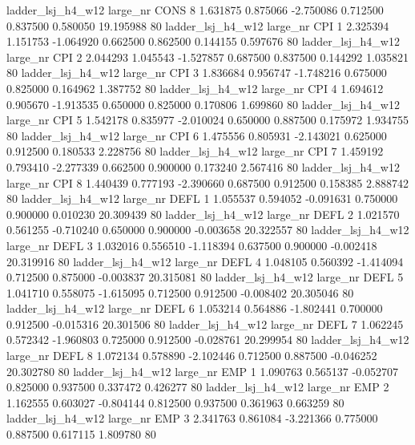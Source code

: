   ladder_lsj_h4_w12   large_nr     CONS                 8  1.631875  0.875066  -2.750086 0.712500 0.837500  0.580050   19.195988 80
  ladder_lsj_h4_w12   large_nr      CPI                 1  2.325394  1.151753  -1.064920 0.662500 0.862500  0.144155    0.597676 80
  ladder_lsj_h4_w12   large_nr      CPI                 2  2.044293  1.045543  -1.527857 0.687500 0.837500  0.144292    1.035821 80
  ladder_lsj_h4_w12   large_nr      CPI                 3  1.836684  0.956747  -1.748216 0.675000 0.825000  0.164962    1.387752 80
  ladder_lsj_h4_w12   large_nr      CPI                 4  1.694612  0.905670  -1.913535 0.650000 0.825000  0.170806    1.699860 80
  ladder_lsj_h4_w12   large_nr      CPI                 5  1.542178  0.835977  -2.010024 0.650000 0.887500  0.175972    1.934755 80
  ladder_lsj_h4_w12   large_nr      CPI                 6  1.475556  0.805931  -2.143021 0.625000 0.912500  0.180533    2.228756 80
  ladder_lsj_h4_w12   large_nr      CPI                 7  1.459192  0.793410  -2.277339 0.662500 0.900000  0.173240    2.567416 80
  ladder_lsj_h4_w12   large_nr      CPI                 8  1.440439  0.777193  -2.390660 0.687500 0.912500  0.158385    2.888742 80
  ladder_lsj_h4_w12   large_nr     DEFL                 1  1.055537  0.594052  -0.091631 0.750000 0.900000  0.010230   20.309439 80
  ladder_lsj_h4_w12   large_nr     DEFL                 2  1.021570  0.561255  -0.710240 0.650000 0.900000 -0.003658   20.322557 80
  ladder_lsj_h4_w12   large_nr     DEFL                 3  1.032016  0.556510  -1.118394 0.637500 0.900000 -0.002418   20.319916 80
  ladder_lsj_h4_w12   large_nr     DEFL                 4  1.048105  0.560392  -1.414094 0.712500 0.875000 -0.003837   20.315081 80
  ladder_lsj_h4_w12   large_nr     DEFL                 5  1.041710  0.558075  -1.615095 0.712500 0.912500 -0.008402   20.305046 80
  ladder_lsj_h4_w12   large_nr     DEFL                 6  1.053214  0.564886  -1.802441 0.700000 0.912500 -0.015316   20.301506 80
  ladder_lsj_h4_w12   large_nr     DEFL                 7  1.062245  0.572342  -1.960803 0.725000 0.912500 -0.028761   20.299954 80
  ladder_lsj_h4_w12   large_nr     DEFL                 8  1.072134  0.578890  -2.102446 0.712500 0.887500 -0.046252   20.302780 80
  ladder_lsj_h4_w12   large_nr      EMP                 1  1.090763  0.565137  -0.052707 0.825000 0.937500  0.337472    0.426277 80
  ladder_lsj_h4_w12   large_nr      EMP                 2  1.162555  0.603027  -0.804144 0.812500 0.937500  0.361963    0.663259 80
  ladder_lsj_h4_w12   large_nr      EMP                 3  2.341763  0.861084  -3.221366 0.775000 0.887500  0.617115    1.809780 80
